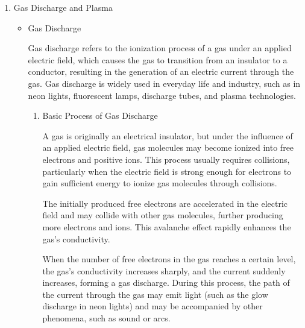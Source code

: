 \begin{enumerate}
\begin{enumerate}
\begin{enumerate}
			To achieve a gradual transition from rough vacuum to ultra-high vacuum, multiple vacuum pumps are often used in combination. Such combined systems typically include:
			\begin{itemize}
				\item Backing Pump: Such as rotary vane pumps or oil-sealed pumps, used for initially lowering the pressure in the system.
				\item Main Pump: Such as turbo molecular pumps or diffusion pumps, used to further reduce the pressure to achieve high vacuum.
				\item Auxiliary Pump: Such as ion pumps or cryopumps, used to maintain ultra-high vacuum or remove residual gases.
			\end{itemize}			
		\end{enumerate}	
	\end{enumerate}
	
	\item Gas Discharge and Plasma
	\begin{itemize}
		\item Gas Discharge
		
		Gas discharge refers to the ionization process of a gas under an applied electric field, which causes the gas to transition from an insulator to a conductor, resulting in the generation of an electric current through the gas. Gas discharge is widely used in everyday life and industry, such as in neon lights, fluorescent lamps, discharge tubes, and plasma technologies.
		
		\begin{enumerate}
			\item Basic Process of Gas Discharge
			
			A gas is originally an electrical insulator, but under the influence of an applied electric field, gas molecules may become ionized into free electrons and positive ions. This process usually requires collisions, particularly when the electric field is strong enough for electrons to gain sufficient energy to ionize gas molecules through collisions.
			
			The initially produced free electrons are accelerated in the electric field and may collide with other gas molecules, further producing more electrons and ions. This avalanche effect rapidly enhances the gas's conductivity.
			
			When the number of free electrons in the gas reaches a certain level, the gas's conductivity increases sharply, and the current suddenly increases, forming a gas discharge. During this process, the path of the current through the gas may emit light (such as the glow discharge in neon lights) and may be accompanied by other phenomena, such as sound or arcs.
			

\end{enumerate}
\end{itemize}
\end{enumerate}
